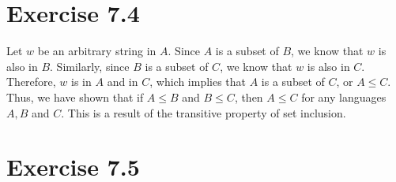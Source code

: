\documentclass{article} %
\newcommand{\homeworkNumber}{7}
\begin{document}
\section*{Exercise \homeworkNumber.4}
Let $w$ be an arbitrary string in $A$. Since $A$ is a subset of $B$, we know that $w$ is also in $B$. Similarly, since $B$ is a subset of $C$, we know that $w$ is also in $C$. Therefore, $w$ is in $A$ and in $C$, which implies that $A$ is a subset of $C$, or $A \le C$.\\
Thus, we have shown that if $A \le B$ and $B \le C$, then $A \le C$ for any languages $A, B$ and $C$. This is a result of the transitive property of set inclusion.

\section*{Exercise \homeworkNumber.5}
\end{document}
